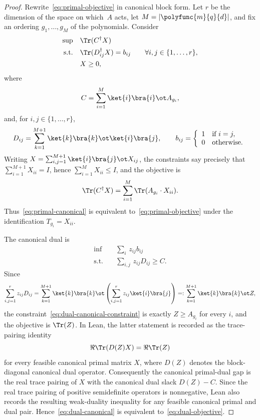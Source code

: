 \begin{proof}
  \leanok
  Rewrite~\eqref{eq:primal-objective} in canonical block form. Let $r$ be the dimension of the space on which~$A$ acts, let $M = |\polyfunc{m}{q}{d}|$, and fix an ordering $g_1,\ldots,g_M$ of the polynomials. Consider
  \begin{align}
    \sup &\quad \Tr(C^\dagger X) \label{eq:primal-canonical}\\
    \text{s.t.} &\quad \Tr(D_{ij}^\dagger X) = b_{ij} \qquad\forall i,j\in\{1,\ldots,r\}, \notag\\
    &\quad X \geq 0, \notag
  \end{align}
  where
  \[
    C = \sum_{i = 1}^M \ket{i}\bra{i} \ot A_{g_i},
  \]
  and, for $i,j \in \{1,\ldots,r\}$,
  \[
    D_{ij} = \sum_{k=1}^{M+1} \ket{k}\bra{k} \ot \ket{i}\bra{j},
    \qquad
    b_{ij}  = \left\{\begin{array}{rl}
      1 & \text{if } i = j,\\
      0 & \text{otherwise}.
    \end{array}\right.
  \]
  Writing $X=\sum_{i,j=1}^{M+1}\ket{i}\bra{j}\ot X_{ij}$, the constraints say precisely that $\sum_{i=1}^{M+1} X_{ii}=I$, hence $\sum_{i=1}^{M}X_{ii}\le I$, and the objective is
  \[
    \Tr(C^\dagger X)=\sum_{i=1}^M \Tr(A_{g_i}\cdot X_{ii}).
  \]
  Thus~\eqref{eq:primal-canonical} is equivalent to~\eqref{eq:primal-objective} under the identification $T_{g_i}=X_{ii}$.

  The canonical dual is
  \begin{align}
    \inf &\quad \sum_i\, z_{ij} b_{ij} \label{eq:dual-canonical}\\
    \text{s.t.} &\quad  \sum_{i,j} \,z_{ij} D_{ij} \geq C. \label{eq:dual-canonical-constraint}
  \end{align}
  Since
  \[
    \sum_{i,j=1}^r z_{ij} D_{ij}
    = \sum_{k=1}^{M+1} \ket{k}\bra{k} \ot \left(\sum_{i,j=1}^r z_{ij}\ket{i}\bra{j}\right)
    =: \sum_{k=1}^{M+1}\ket{k}\bra{k} \ot Z,
  \]
  the constraint~\eqref{eq:dual-canonical-constraint} is exactly $Z\ge A_{g_i}$ for every $i$, and the objective is $\Tr(Z)$.  In Lean, the latter statement is recorded as the trace-pairing identity
  \[
    \Re\Tr(D(Z)X)=\Re\Tr(Z)
  \]
  for every feasible canonical primal matrix \(X\), where \(D(Z)\) denotes the
  block-diagonal canonical dual operator.  Consequently the canonical
  primal-dual gap is the real trace pairing of \(X\) with the canonical dual
  slack \(D(Z)-C\).  Since the real trace pairing of positive semidefinite
  operators is nonnegative, Lean also records the resulting weak-duality
  inequality for any feasible canonical primal and dual pair.
  Hence~\eqref{eq:dual-canonical} is equivalent to~\eqref{eq:dual-objective}.


\end{proof}
